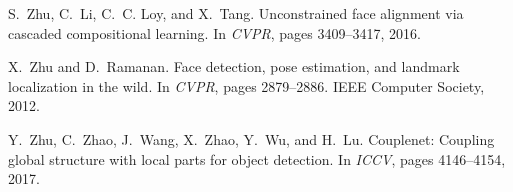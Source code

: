 \documentclass[10pt,twocolumn,letterpaper]{article}
\begin{document}
{\begin{thebibliography}{100}
S.~Zhu, C.~Li, C.~C. Loy, and X.~Tang.
\newblock Unconstrained face alignment via cascaded compositional learning.
\newblock In {\em {CVPR}}, pages 3409--3417, 2016.

X.~Zhu and D.~Ramanan.
\newblock Face detection, pose estimation, and landmark localization in the
  wild.
\newblock In {\em {CVPR}}, pages 2879--2886. {IEEE} Computer Society, 2012.

Y.~Zhu, C.~Zhao, J.~Wang, X.~Zhao, Y.~Wu, and H.~Lu.
\newblock Couplenet: Coupling global structure with local parts for object
  detection.
\newblock In {\em {ICCV}}, pages 4146--4154, 2017.

\end{thebibliography}
}
\end{document}
